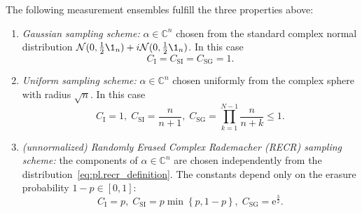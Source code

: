 \begin{proposition}%
  \label{prop:gauss+recr_requirements}
  The following measurement ensembles fulfill the three properties above:
  \begin{enumerate}
    \item\label{item:gauss+recr_requirements.gaussian} \emph{Gaussian sampling scheme:} $\alpha \in \mathbb{C}^n$ chosen from the standard complex normal distribution $\mathcal{N}(0,\tfrac{1}{2}\1_n)+ i \mathcal{N}(0,\tfrac{1}{2}\1_n)$.
    In this case
    \[
      C_\mathrm{I} = C_\mathrm{SI} = C_\mathrm{SG} = 1.
    \]

    \item\label{item:gauss+recr_requirements.uniform} \emph{Uniform sampling scheme:} $\alpha \in \mathbb{C}^n$ chosen uniformly from the complex sphere with radius $\sqrt{n}$.
    In this case
    \[
      C_\mathrm{I} = 1, \; C_\mathrm{SI} = \frac{n}{n+1}, \; C_\mathrm{SG} = \prod_{k=1}^{N-1} \frac{n}{n+k} \leq 1.
    \]

    \item\label{item:gauss+recr_requirements.recr} \emph{(unnormalized) Randomly Erased Complex Rademacher (RECR) sampling scheme:} the components of $\alpha \in \mathbb{C}^n$ are chosen independently from the distribution~\eqref{eq:pl.recr_definition}.
    The constants depend only on the erasure probability $1-p \in [0,1]$:
    \[
      C_\mathrm{I} = p,\; C_\mathrm{SI} = p \min \left\{p,1-p \right\}, \; C_\mathrm{SG} = \mathrm{e}^{\frac{3}{2}}.
    \]
  \end{enumerate}
\end{proposition}

